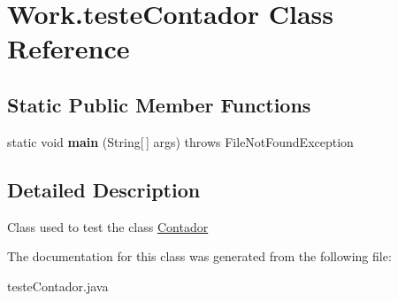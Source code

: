 \hypertarget{classWork_1_1testeContador}{}\section{Work.\+teste\+Contador Class Reference}
\label{classWork_1_1testeContador}
\subsection*{Static Public Member Functions}
\begin{DoxyCompactItemize}
\item 
\mbox{\label{classWork_1_1testeContador_a0a651c6a1d649cae4ef7c0bca6599f1f}} 
static void {\bfseries main} (String\mbox{[}$\,$\mbox{]} args)  throws File\+Not\+Found\+Exception 
\end{DoxyCompactItemize}


\subsection{Detailed Description}
Class used to test the class \hyperlink{classWork_1_1Contador}{Contador} 

The documentation for this class was generated from the following file\+:\begin{DoxyCompactItemize}
\item 
teste\+Contador.\+java\end{DoxyCompactItemize}
